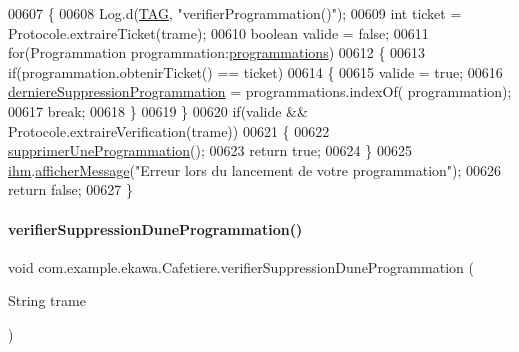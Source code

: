 \begin{DoxyCode}
00607     \{
00608         Log.d(\hyperlink{classcom_1_1example_1_1ekawa_1_1_cafetiere_aa0c1fd99a2508b06c462aea17034aa91}{TAG}, \textcolor{stringliteral}{"verifierProgrammation()"});
00609         \textcolor{keywordtype}{int} ticket = Protocole.extraireTicket(trame);
00610         \textcolor{keywordtype}{boolean} valide = \textcolor{keyword}{false};
00611         \textcolor{keywordflow}{for}(Programmation programmation:\hyperlink{classcom_1_1example_1_1ekawa_1_1_cafetiere_a987c8e1bcea506b65f4b05f955b3f699}{programmations})
00612         \{
00613             \textcolor{keywordflow}{if}(programmation.obtenirTicket() == ticket)
00614             \{
00615                 valide = \textcolor{keyword}{true};
00616                 \hyperlink{classcom_1_1example_1_1ekawa_1_1_cafetiere_a79faede6506425563ec617affef48e09}{derniereSuppressionProgrammation} = programmations.indexOf(
      programmation);
00617                 \textcolor{keywordflow}{break};
00618             \}
00619         \}
00620         \textcolor{keywordflow}{if}(valide && Protocole.extraireVerification(trame))
00621         \{
00622             \hyperlink{classcom_1_1example_1_1ekawa_1_1_cafetiere_a40880363bf27354c1a7cb5df139fae53}{supprimerUneProgrammation}();
00623             \textcolor{keywordflow}{return} \textcolor{keyword}{true};
00624         \}
00625         \hyperlink{classcom_1_1example_1_1ekawa_1_1_cafetiere_a7db4a63088834eda5f6a3e951611bf82}{ihm}.\hyperlink{classcom_1_1example_1_1ekawa_1_1_ihm_ab1ca33ad18d42540299e3a58a82f4d9a}{afficherMessage}(\textcolor{stringliteral}{"Erreur lors du lancement de votre programmation"});
00626         \textcolor{keywordflow}{return} \textcolor{keyword}{false};
00627     \}
\end{DoxyCode}
\mbox{\label{classcom_1_1example_1_1ekawa_1_1_cafetiere_a316296ae1fad708259a403c60099caa1}} 
\paragraph{\texorpdfstring{verifier\+Suppression\+Dune\+Programmation()}{verifierSuppressionDuneProgrammation()}}
{\footnotesize\ttfamily void com.\+example.\+ekawa.\+Cafetiere.\+verifier\+Suppression\+Dune\+Programmation (\begin{DoxyParamCaption}\item[{String}]{trame }\end{DoxyParamCaption})\hspace{0.3cm}{\ttfamily [private]}}



